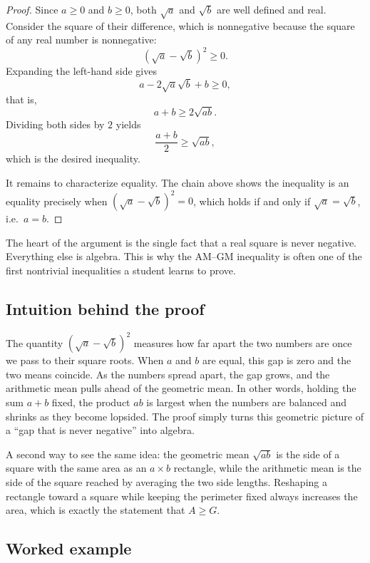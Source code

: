 \begin{proof}
Since $a \geq 0$ and $b \geq 0$, both $\sqrt{a}$ and $\sqrt{b}$ are well defined and real. Consider the square of their difference, which is nonnegative because the square of any real number is nonnegative:
\[
\left( \sqrt{a} - \sqrt{b} \right)^2 \geq 0.
\]
Expanding the left-hand side gives
\[
a - 2\sqrt{a}\sqrt{b} + b \geq 0,
\]
that is,
\[
a + b \geq 2\sqrt{ab}.
\]
Dividing both sides by $2$ yields
\[
\frac{a + b}{2} \geq \sqrt{ab},
\]
which is the desired inequality.

It remains to characterize equality. The chain above shows the inequality is an equality precisely when $\left( \sqrt{a} - \sqrt{b} \right)^2 = 0$, which holds if and only if $\sqrt{a} = \sqrt{b}$, i.e.\ $a = b$.
\end{proof}

\begin{remark}
The heart of the argument is the single fact that a real square is never negative. Everything else is algebra. This is why the AM--GM inequality is often one of the first nontrivial inequalities a student learns to prove.
\end{remark}

\subsection{Intuition behind the proof}

The quantity $\left(\sqrt{a} - \sqrt{b}\right)^2$ measures how far apart the two numbers are once we pass to their square roots. When $a$ and $b$ are equal, this gap is zero and the two means coincide. As the numbers spread apart, the gap grows, and the arithmetic mean pulls ahead of the geometric mean. In other words, holding the sum $a + b$ fixed, the product $ab$ is largest when the numbers are balanced and shrinks as they become lopsided. The proof simply turns this geometric picture of a ``gap that is never negative'' into algebra.

A second way to see the same idea: the geometric mean $\sqrt{ab}$ is the side of a square with the same area as an $a \times b$ rectangle, while the arithmetic mean is the side of the square reached by averaging the two side lengths. Reshaping a rectangle toward a square while keeping the perimeter fixed always increases the area, which is exactly the statement that $A \geq G$.

\subsection{Worked example}

